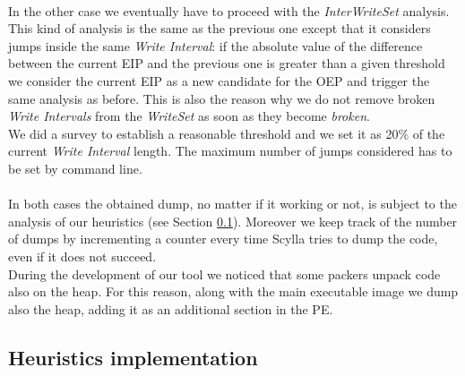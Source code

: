 \paragraph{}
In the other case we eventually have to proceed with the \textit{InterWriteSet} analysis. This kind of analysis is the same as the previous one except that it considers jumps inside the same \textit{Write Interval}: if the absolute value of the difference between the current EIP and the previous one is greater than a given threshold we consider the current EIP as a new candidate for the OEP and trigger the same analysis as before. This is also the reason why we do not remove broken \textit{Write Intervals} from the \textit{WriteSet} as soon as they become \textit{broken}.\\
We did a survey to establish a reasonable threshold and we set it as 20\% of the current  \textit{Write Interval} length. The maximum number of jumps considered has to be set by command line.
\paragraph{}
In both cases the obtained dump, no matter if it working or not, is subject to the analysis of our heuristics (see Section \ref{Heuristics implementation}). Moreover we keep track of the number of dumps by incrementing a counter every time Scylla tries to dump the code, even if it does not succeed.\\
During the development of our tool we noticed that some packers unpack code also on the heap. For this reason, along with the main executable image we dump also the heap, adding it as an additional section in the PE.
\label{Dumping module}

\subsection{Heuristics implementation}
\label{Heuristics implementation}